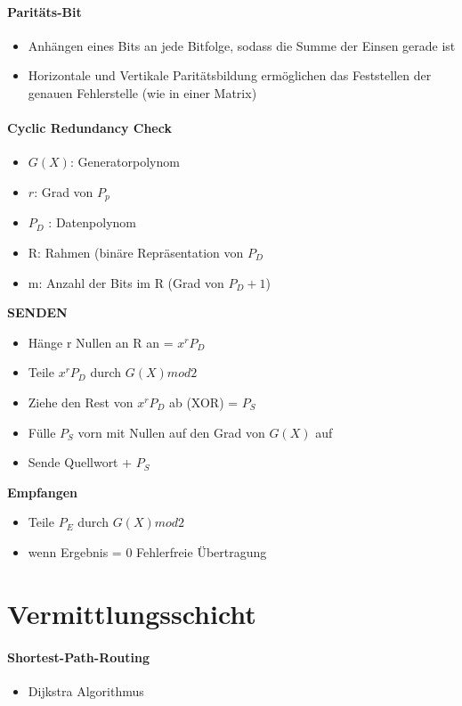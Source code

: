\documentclass[12pt,a4paper]{article}
\begin{document}
\paragraph{Paritäts-Bit}
\begin{itemize}
\item Anhängen eines Bits an jede Bitfolge, sodass die Summe der Einsen gerade ist
\item Horizontale und Vertikale Paritätsbildung ermöglichen das Feststellen der genauen Fehlerstelle (wie in einer Matrix)
\end{itemize}
\paragraph{Cyclic Redundancy Check}
\begin{itemize}
\item $G(X)$: Generatorpolynom
\item $r$: Grad von $P_p$
\item $P_D$ : Datenpolynom
\item R: Rahmen (binäre Repräsentation von $P_D$
\item m: Anzahl der Bits im R (Grad von $P_D +1$)
\end{itemize}
\textbf{SENDEN}
\begin{itemize}
\item Hänge r Nullen an R an = $x^rP_D$
\item Teile $x^rP_D$ durch $G(X) mod 2$
\item Ziehe den Rest von $x^rP_D$ ab (XOR) = $P_S$
\item Fülle $P_S$ vorn mit Nullen auf den Grad von $G(X)$ auf
\item Sende Quellwort + $P_S$
\end{itemize}
\textbf{Empfangen}
\begin{itemize}
\item Teile $P_E$ durch $G(X) mod 2$
\item wenn Ergebnis = 0 Fehlerfreie Übertragung
\end{itemize}


\section{Vermittlungsschicht}
\paragraph{Shortest-Path-Routing}
\begin{itemize}
\item Dijkstra Algorithmus
\end{itemize}
\end{document}
